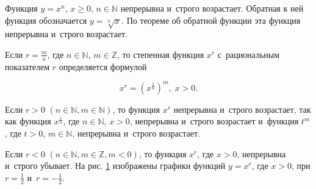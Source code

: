 
Функция $y = x^{n}$, $x \geqslant 0$, $n \in \mathbb{N}$ непрерывна и~строго
возрастает. Обратная к ней функция обозначается $y = \sqrt[n]{x}$.
По теореме об обратной функции эта функция непрерывна и~строго возрастает.

Если $\displaystyle r = \frac{m}{n}$, где $n \in \mathbb{N}$, $m \in \mathbb{Z}$,
то степенная функция $x^{r}$ с~рациональным показателем $r$ определяется формулой

\begin{equation*}
\displaystyle x^{r} = \left( x^{\frac{1}{n}} \right)^{m}, \; x > 0.
\end{equation*}

\noindent
Если $r > 0$ $(n \in \mathbb{N}, m \in \mathbb{N})$, то функция $x^{r}$
непрерывна и~строго возрастает, так как функция $\displaystyle x^{\frac{1}{n}}$,
где $n \in \mathbb{N}$, $x > 0$, непрерывна и~строго возрастает и~функция $t^{m}$,
где $t > 0$, $m \in \mathbb{N}$, непрерывна и~строго возрастает.

Если $r < 0$ $(n \in \mathbb{N}, m \in \mathbb{Z}, m < 0)$, то функция $x^{r}$,
где $x > 0$, непрерывна и~строго убывает. На рис. \ref{fig:4_3_4_17} изображены
графики функций $y = x^{r}$, где $x > 0$, при $\displaystyle r = \frac{1}{2}$
и~$\displaystyle r = -\frac{1}{2}$.

\begin{figure}\label{fig:4_3_4_17}
\end{figure}
